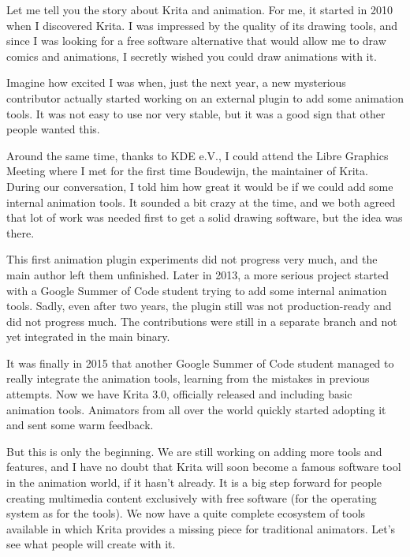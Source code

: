 

\noindent{}Let me tell you the story about Krita and animation. For me, it started in 2010 when I discovered Krita. I was impressed by the quality of its drawing tools, and since I was looking for a free software alternative that would allow me to draw comics and animations, I secretly wished you could draw animations with it. 

Imagine how excited I was when, just the next year, a new mysterious contributor actually started working on an external plugin to add some animation tools. It was not easy to use nor very stable, but it was a good sign that other people wanted this. 

Around the same time, thanks to KDE e.V., I could attend the Libre Graphics Meeting where I met for the first time Boudewijn, the maintainer of Krita. During our conversation, I told him how great it would be if we could add some internal animation tools. It sounded a bit crazy at the time, and we both agreed that lot of work was needed first to get a solid drawing software, but the idea was there.

This first animation plugin experiments did not progress very much, and the main author left them unfinished. Later in 2013, a more serious project started with a Google Summer of Code student trying to add some internal animation tools. Sadly, even after two years, the plugin still was not production-ready and did not progress much. The contributions were still in a separate branch and not yet integrated in the main binary.

It was finally in 2015 that another Google Summer of Code student managed to really integrate the animation tools, learning from the mistakes in previous attempts. Now we have Krita 3.0, officially released and including basic animation tools. Animators from all over the world quickly started adopting it and sent some warm feedback.

But this is only the beginning. We are still working on adding more tools and features, and I have no doubt that Krita will soon become a famous software tool in the animation world, if it hasn't already. It is a big step forward for people creating multimedia content exclusively with free software (for the operating system as for the tools). We now have a quite complete ecosystem of tools available in which Krita provides a missing piece for traditional animators. Let's see what people will create with it.

